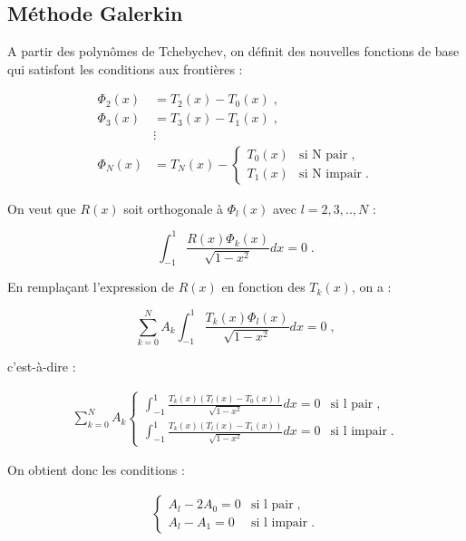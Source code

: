 \documentclass{report}
\begin{document}
\subsection{Méthode Galerkin}

A partir des polynômes de Tchebychev, on définit des nouvelles fonctions de base qui satisfont les conditions aux frontières :

\begin{align}
\Phi_{2}(x) &= T_2(x)-T_0(x)\;,\\
\Phi_{3}(x) &= T_3(x)-T_1(x)\;,\\
 & \vdots\\
\Phi_{N}(x) &= T_N(x)- \begin{cases}
    T_0(x) & \text{si N pair}\;, \\
T_1(x) & \text{si N impair}\;.
  \end{cases}
\end{align}

On veut que $R(x)$ soit orthogonale à $\Phi_l(x)$ avec $l=2,3,..,N$ :

\begin{equation}
\int_{-1}^1 \frac{R(x) \Phi_k(x)}{\sqrt{1-x^2}} dx = 0\;.
\end{equation}

En remplaçant l'expression de $R(x)$ en fonction des $T_k(x)$, on a :

\begin{equation}
\sum_{k=0}^{N}A_{k} \int_{-1}^1 \frac{T_k(x) \Phi_l(x)}{\sqrt{1-x^2}} dx = 0\;,
\end{equation}

c'est-à-dire :

\begin{align}
\sum_{k=0}^{N}A_{k} \begin{cases}
    \int_{-1}^1 \frac{T_k(x) \left(T_l(x)-T_0(x)\right)}{\sqrt{1-x^2}} dx = 0 & \text{si l pair}\;, \\
\int_{-1}^1 \frac{T_k(x) \left(T_l(x)-T_1(x)\right)}{\sqrt{1-x^2}} dx = 0 & \text{si l impair}\;.
  \end{cases}
\end{align}

On obtient donc les conditions :

\begin{align}
\begin{cases}
A_{l} - 2A_{0} = 0 & \text{si l pair}\;, \\
A_{l} - A_{1} = 0 & \text{si l impair}\;.
  \end{cases}
\end{align}
\end{document}
